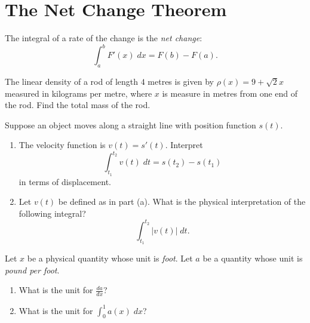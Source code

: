 \documentclass[../main.tex]{subfiles}
\begin{document}
\section{The Net Change Theorem}
\begin{mdframed}[style=withref]
  The integral of a rate of the change is the \emph{net change}:
  \[
    \int_{a}^{b} F'(x) \; dx = F(b) - F(a).
  \]

\end{mdframed}
\vspace{1in}

\begin{example}
  The linear density of a rod of length \(4\) metres is given by \(\rho(x) = 9 + \sqrt{2} x\) measured in kilograms per metre, where \(x\) is measure in metres from one end of the rod. Find the total mass of the rod. 
\end{example}
\clearpage

\begin{example}
  Suppose an object moves along a straight line with position function \(s(t)\). 
 
  \begin{enumerate}[label=(\alph*)]
  \item The velocity function is \(v(t) = s'(t)\). Interpret
    \[
      \int_{t_{1}}^{t_{2}} v(t) \;dt = s(t_{2}) - s(t_{1})
    \]
    in terms of displacement.
    \vspace{1in}

  \item Let \(v(t)\) be defined as in part (a). What is the physical interpretation of the following integral?
    \[
      \int_{t_{1}}^{t_{2}} |v(t)| \; dt.
    \]
    \vspace{2in}
  \end{enumerate}
\end{example}

\begin{example}
  Let \(x\) be a physical quantity whose unit is \emph{foot}. Let \(a\) be a quantity whose unit is \emph{pound per foot}.
  \begin{enumerate}
  \item What is the unit for \(\frac{da}{dx}\)?
    \vspace{1in}
  \item What is the unit for \(\int_{0}^{1} a(x) \;dx\)?
    \vspace{1in}
  \end{enumerate}
\end{example}
\end{document}
